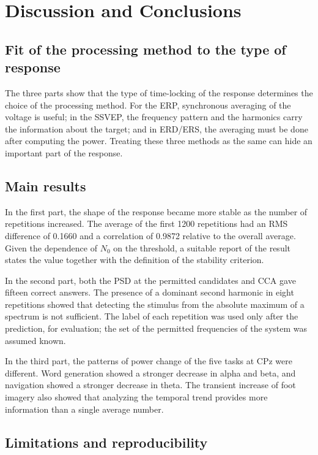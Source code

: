 \section{Discussion and Conclusions}

\subsection*{Fit of the processing method to the type of response}

The three parts show that the type of time-locking of the response determines the choice of the processing method. For the ERP, synchronous averaging of the voltage is useful; in the SSVEP, the frequency pattern and the harmonics carry the information about the target; and in ERD/ERS, the averaging must be done after computing the power. Treating these three methods as the same can hide an important part of the response.

\subsection*{Main results}

In the first part, the shape of the response became more stable as the number of repetitions increased. The average of the first 1200 repetitions had an RMS difference of 0.1660 and a correlation of 0.9872 relative to the overall average. Given the dependence of $N_0$ on the threshold, a suitable report of the result states the value together with the definition of the stability criterion.

In the second part, both the PSD at the permitted candidates and CCA gave fifteen correct answers. The presence of a dominant second harmonic in eight repetitions showed that detecting the stimulus from the absolute maximum of a spectrum is not sufficient. The label of each repetition was used only after the prediction, for evaluation; the set of the permitted frequencies of the system was assumed known.

In the third part, the patterns of power change of the five tasks at CPz were different. Word generation showed a stronger decrease in alpha and beta, and navigation showed a stronger decrease in theta. The transient increase of foot imagery also showed that analyzing the temporal trend provides more information than a single average number.

\subsection*{Limitations and reproducibility}

